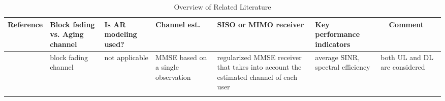 \documentclass[conference, a4paper, 10pt]{IEEEtran}
\begin{document}
\begin{table*}[h!]
	\centering
	\caption{Overview of Related Literature}
	\vspace{2mm}
	\label{tab:tab1}
	\footnotesize
	\begin{tabular}{
			|p{}|
			>{\centering}p{}|
			>{\centering}p{}|
			>{\centering}p{}|
			>{\centering}p{}|
			>{\centering}p{}|
			p{}|}
		\hline
		\textbf{Reference} & \textbf{Block fading vs. Aging channel} & \textbf{Is \ac{AR} modeling used?}
		& \textbf{Channel est.} & \textbf{SISO or MIMO receiver} & \textbf{Key performance indicators} & \textbf{~~Comment}  \\
		\hline
		\begin{comment}
		\hline
		Hoydis et al., \cite{Hoydis:13} & block fading channel & not applicable & MMSE based on a single observation
		& regularized MMSE receiver that takes into account the estimated channel of each user & average SINR, spectral efficiency & both UL and DL are considered \\
		\end{comment}
		

\end{tabular}
\end{table*}
\end{document}

